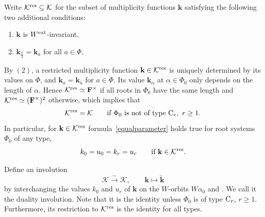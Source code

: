 \documentclass[pdftex]{sigma}
\numberwithin{equation}{section}
\begin{document}
Write $\mathcal{K}^{{\rm res}}\subseteq\mathcal{K}$ for the subset of multiplicity functions $\mathbf{k}$ satisfying the following
two additional conditions:
\begin{enumerate}\itemsep=0pt
\item[$ (1)$] $\mathbf{k}$ is $W^{\textup{ext}}$-invariant,
\item[$(2)$] $\mathbf{k}_{\frac{a}{2}}=\mathbf{k}_a$ for all $a\in\Phi$.
\end{enumerate}
By $(2)$, a restricted multiplicity function $\mathbf{k}\in\mathcal{K}^{{\rm res}}$ is uniquely determined by its values on $\Phi$, and $\mathbf{k}_a=\mathbf{k}_{\overline{a}}$ for $a\in\Phi$. Its value $\mathbf{k}_\alpha$ at $\alpha\in\Phi_0$ only depends on the length of $\alpha$. Hence $\mathcal{K}^{{\rm res}}\simeq\mathbf{F}^\times$ if all roots in $\Phi_0$ have the same length and
$\mathcal{K}^{{\rm res}}\simeq (\mathbf{F}^\times)^2$ otherwise, which implies that
\[
\mathcal{K}^{{\rm res}}=\mathcal{K}\qquad \textup{if }  \Phi_0 \ \textup{is not of type}\ {\rm C}_r,\ r\geq 1.
\]
In particular, for $\mathbf{k}\in\mathcal{K}^{{\rm res}}$ formula~\eqref{equalparameter} holds true for root systems $\Phi_0$ of any type,
\[
k_0=u_0=k_r=u_r\qquad \text{if}\ \mathbf{k}\in\mathcal{K}^{{\rm res}}.
\]

Define an involution
\begin{equation*}%
\mathcal{K}\overset{\sim}{\longrightarrow}\mathcal{K},\qquad \mathbf{k}\mapsto \widetilde{\mathbf{k}}
\end{equation*}
by interchanging the values $k_0$ and $u_r$ of $\mathbf{k}$ on the $W$-orbits $W\alpha_0$ and . We call it the duality involution.
Note that it is the identity unless $\Phi_0$ is of type ${\rm C}_r$, $r\geq 1$. Furthermore, its restriction to $\mathcal{K}^{{\rm res}}$ is the identity for all types.
\end{document}
